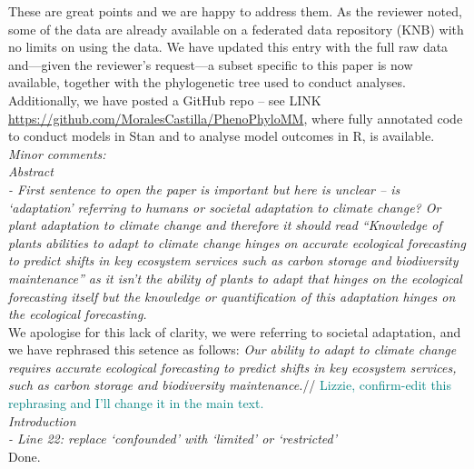 \documentclass[11pt]{article}
\begin{document}

These are great points and we are happy to address them. As the reviewer noted, some of the data are already available on a federated data repository (KNB) with no limits on using the data. We have updated this entry with the full raw data and---given the reviewer's request---a subset specific to this paper is now available, together with the phylogenetic tree used to conduct analyses. Additionally, we have posted a GitHub repo -- see LINK \url{https://github.com/MoralesCastilla/PhenoPhyloMM}, 
where fully annotated code to conduct models in Stan and to analyse model outcomes in R, is available.\\

\emph{Minor comments:}\\

\emph{Abstract}\\
\emph{- First sentence to open the paper is important but here is unclear – is ‘adaptation’ referring to humans or societal adaptation to climate change? Or plant adaptation to climate change and therefore it should read “Knowledge of plants abilities to adapt to climate change hinges on accurate ecological forecasting to predict shifts in key ecosystem services such as carbon storage and biodiversity maintenance” as it isn’t the ability of plants to adapt that hinges on the ecological forecasting itself but the knowledge or quantification of this adaptation hinges on the ecological forecasting.}\\

We apologise for this lack of clarity, we were referring to societal adaptation, and we have rephrased this setence as follows: \emph{Our ability to adapt to climate change requires accurate ecological forecasting to predict shifts in key ecosystem services, such as carbon storage and biodiversity maintenance.}// %
\textcolor{teal}{Lizzie, confirm-edit this rephrasing and I'll change it in the main text.}\\


\emph{Introduction}\\
\emph{- Line 22: replace ‘confounded’ with ‘limited’ or ‘restricted’}\\
Done.\\
\end{document}
